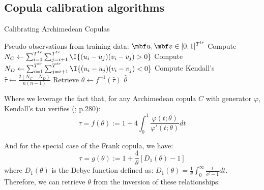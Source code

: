 \begin{itemize}
    
\end{itemize}




\subsection{Copula calibration algorithms} \label{subsec:copula_calibration}

\begin{algorithm}[H]
\label{alg:calibrating_archimedean}
\caption{Calibrating Archimedean Copulas}
\begin{algorithmic}[1]
\Require Pseudo-observations from training data: $\mbf u,\mbf v\in [0,1]^{T^{tr}}$
\State Compute $N_C \gets \sum_{i=1}^{T^{tr}}\sum_{j=i+1}^{T^{tr}} \I{(u_i-u_j)(v_i-v_j) > 0}$
\State Compute $N_D \gets \sum_{i=1}^{T^{tr}}\sum_{j=i+1}^{T^{tr}} \I{(u_i-u_j)(v_i-v_j) < 0}$
\State Compute Kendall's $\displaystyle \hat \tau \gets \frac{2(N_C-N_D)}{n(n-1)}$
\State Retrieve $\hat \theta \gets f^{-1}(\hat \tau)$
\Ensure $\hat \theta $
\end{algorithmic}
\end{algorithm}

Where we leverage the fact that, for any Archimedean copula $C$ with generator $\varphi$, Kendall's tau verifies (\cite{alexander2008market}; p.280):
$$
\tau 
= f(\theta):=
1+4 \int_{0}^{1} \frac{\varphi(t;\theta)}{\varphi'(t;\theta)}dt
$$

And for the special case of the Frank copula, we have:
$$
\tau = g(\theta) := 1+\frac{4}{\theta}[D_1(\theta)-1]
$$
where $D_1(\theta)$ is the Debye function defined as:
$
D_1(\theta)=\frac{1}{\theta}\int_{0}^{\infty} \frac{t}{e^t-1}dt
$.
Therefore, we can retrieve $\theta$ from the inversion of these relationships:

